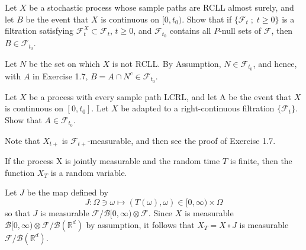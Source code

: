 \documentclass{report}
\begin{document}
\begin{exe}
	Let \( X \) be a stochastic process whose sample paths are RCLL almost surely, and let \( B \) be the event that \( X \) is continuous on \( [0,t_0) \).
	Show that if \( \{\mathscr{F}_t\; ;\;t\ge0\} \) is a filtration satisfying
	\( \mathscr{F}_t^X \subset \mathscr{F}_t \), \( t\ge0 \), and \( \mathscr{F}_{t_0} \) contains
	all \( P \)-null sets of \( \mathscr{F} \), then \( B\in \mathscr{F}_{t_0} \). 
\end{exe}
\begin{prf}
	Let \( N \) be the set on which \( X \) is not RCLL.
	By Assumption, \( N\in \mathscr{F}_{t_0} \), and hence, with \( A \) in Exercise 1.7, \( B=A\cap N^c\in \mathscr{F}_{t_0} \).
\end{prf}

\setcounter{exe}{9} %
\begin{exe}
	Let \( X \) be a process with every sample path LCRL, and let A be the event that \( X \)
	is continuous on \( [0,t_0] \).
	Let \( X \) be adapted to a right-continuous filtration \( \{\mathscr{F}_t\} \).
	Show that \( A\in \mathscr{F}_{t_0} \).
\end{exe}
\begin{prf}
	Note that \( X_{t+} \) is \( \mathscr{F}_{t+} \)-measurable, and then see the proof of Exercise 1.7.
\end{prf}

\setcounter{exe}{15} %
\begin{prob}
	If the process X is jointly measurable and the random time \( T \) is finite,
	then the function \( X_T \) is a random variable.
\end{prob}
\begin{prf}
	Let \( J \) be the map defined by
	\[
		J:\Omega \ni \omega \mapsto (T(\omega),\omega) \in [0,\infty)\times \Omega
	\]
	so that \( J \) is measurable \( \mathscr{F}/\mathscr{B}[0,\infty)\otimes \mathscr{F} \).
	Since \( X \) is measurable \( \mathscr{B}[0,\infty)\otimes \mathscr{F}/\mathscr{B}(\mathbb{R}^d) \)
	by assumption, it follows that \( X_T=X\circ J \) is measurable \( \mathscr{F}/\mathscr{B}(\mathbb{R}^d) \).
\end{prf}
\end{document}

